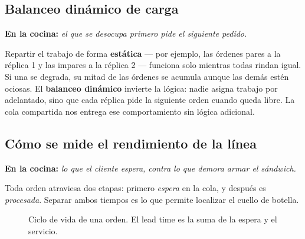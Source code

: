 \documentclass[11pt,a4paper]{article}
\newcommand{\cocina}[1]{%
  \vspace{1pt}%
  {\small\color{usachteal}\textbf{En la cocina:} \textit{#1}}\par\vspace{1pt}}
\begin{document}
\subsection{Balanceo dinámico de carga}

\cocina{el que se desocupa primero pide el siguiente pedido.}

Repartir el trabajo de forma \textbf{estática} --- por ejemplo, las órdenes pares a la réplica 1 y las impares a la réplica 2 --- funciona solo mientras todas rindan igual. Si una se degrada, su mitad de las órdenes se acumula aunque las demás estén ociosas. El \textbf{balanceo dinámico} invierte la lógica: nadie asigna trabajo por adelantado, sino que cada réplica pide la siguiente orden cuando queda libre. La cola compartida nos entrega ese comportamiento sin lógica adicional.

\subsection{Cómo se mide el rendimiento de la línea}

\cocina{lo que el cliente espera, contra lo que demora armar el sándwich.}

Toda orden atraviesa dos etapas: primero \emph{espera} en la cola, y después es \emph{procesada}. Separar ambos tiempos es lo que permite localizar el cuello de botella.

\begin{figure}[H]
\centering
{}
\caption{Ciclo de vida de una orden. El lead time es la suma de la espera y el servicio.}
\end{figure}
\end{document}
